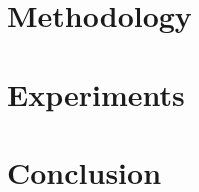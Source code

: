 \documentclass{mpaper}
\begin{document}
\par \lipsum[1]



\par \lipsum[1]



\section{Methodology}

\lipsum[1-3]

 \section{Experiments}

\lipsum[1-3]

\section{Conclusion}

\lipsum[1]



\end{document}
